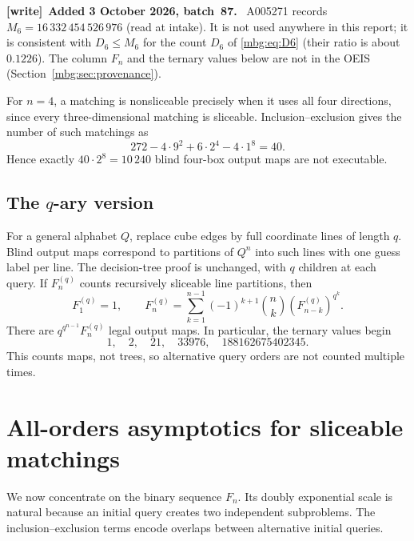 \documentclass[11pt,letterpaper]{article}
\theoremstyle{definition}
\newenvironment{writenote}[1][]{\par\smallskip\begingroup\small
 \noindent\textbf{[write]}\if\relax\detokenize{#1}\relax\else~\textbf{#1.}\fi\ }%
 {\par\endgroup\smallskip}
\begin{document}
\begin{writenote}[Added 3 October 2026, batch~87]
A005271 records $M_6=16\,332\,454\,526\,976$ (read at intake). It is not used anywhere in this report; it is consistent with $D_6\le M_6$ for the count $D_6$ of \eqref{mbg:eq:D6} (their ratio is about $0.1226$). The column $F_n$ and the ternary values below are not in the OEIS (Section~\ref{mbg:sec:provenance}).
\end{writenote}

For $n=4$, a matching is nonsliceable precisely when it uses all four directions, since every three-dimensional matching is sliceable. Inclusion--exclusion gives the number of such matchings as
\[
 272-4\cdot9^2+6\cdot2^4-4\cdot1^8=40.
\]
Hence exactly $40\cdot2^8=10\,240$ blind four-box output maps are not executable.

\subsection{The $q$-ary version}
For a general alphabet $Q$, replace cube edges by full coordinate lines of length $q$. Blind output maps correspond to partitions of $Q^n$ into such lines with one guess label per line. The decision-tree proof is unchanged, with $q$ children at each query. If $F_n^{(q)}$ counts recursively sliceable line partitions, then
\begin{equation}
 F_1^{(q)}=1,\qquad
 F_n^{(q)}=\sum_{k=1}^{n-1}(-1)^{k+1}\binom nk
                     \left(F_{n-k}^{(q)}\right)^{q^k}.
 \label{mbg:eq:qrecurrence}
\end{equation}
There are $q^{q^{n-1}}F_n^{(q)}$ legal output maps. In particular, the ternary values begin
\[
 1,\quad2,\quad21,\quad33976,\quad188162675402345.
\]
This counts maps, not trees, so alternative query orders are not counted multiple times.

\section{All-orders asymptotics for sliceable matchings}
\label{mbg:sec:asymptotics}

We now concentrate on the binary sequence $F_n$. Its doubly exponential scale is natural because an initial query creates two independent subproblems. The inclusion--exclusion terms encode overlaps between alternative initial queries.
\end{document}
